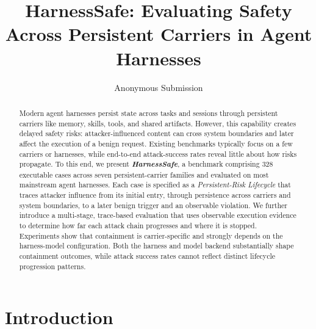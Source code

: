 \documentclass[letterpaper]{article} %
\title{HarnessSafe: Evaluating Safety Across Persistent Carriers in Agent Harnesses}
\author{
    Anonymous Submission
}
\begin{document}
\maketitle

\begin{abstract}
Modern agent harnesses persist state across tasks and sessions through persistent carriers like memory, skills, tools, and shared artifacts. However, this capability creates delayed safety risks: attacker-influenced content can cross system boundaries and later affect the execution of a benign request. Existing benchmarks typically focus on a few carriers or harnesses, while end-to-end attack-success rates reveal little about how risks propagate. 
To this end, we present \textbf{\textit{HarnessSafe}}, a benchmark comprising 328 executable cases across seven persistent-carrier families and evaluated on most mainstream agent harnesses. Each case is specified as a \emph{Persistent-Risk Lifecycle} that traces attacker influence from its initial entry, through persistence across carriers and system boundaries, to a later benign trigger and an observable violation.
We further introduce a multi-stage, trace-based evaluation that uses observable execution evidence to determine how far each attack chain progresses and where it is stopped.
Experiments show that containment is carrier-specific and strongly depends on the harness-model configuration. Both the harness and model backend substantially shape containment outcomes, while attack success rates cannot reflect distinct lifecycle progression patterns.
\end{abstract}

\section{Introduction}
\end{document}
